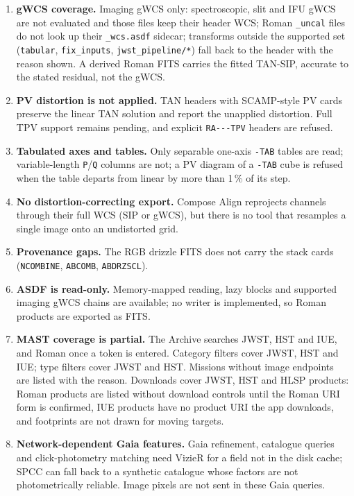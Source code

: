 \documentclass[11pt,a4paper]{article}
\newcommand{\code}[1]{\texttt{\small #1}}
\begin{document}
\begin{enumerate}[nosep]
    \item \textbf{gWCS coverage.} Imaging gWCS only: spectroscopic, slit and IFU gWCS are not evaluated and those files keep their header WCS; Roman \code{\_uncal} files do not look up their \code{\_wcs.asdf} sidecar; transforms outside the supported set (\code{tabular}, \code{fix\_inputs}, \code{jwst\_pipeline/*}) fall back to the header with the reason shown. A derived Roman FITS carries the fitted TAN-SIP, accurate to the stated residual, not the gWCS.
    \item \textbf{PV distortion is not applied.} TAN headers with SCAMP-style PV cards preserve the linear TAN solution and report the unapplied distortion. Full TPV support remains pending, and explicit \code{RA-{}-{}-TPV} headers are refused.
    \item \textbf{Tabulated axes and tables.} Only separable one-axis \code{-TAB} tables are read; variable-length \code{P}/\code{Q} columns are not; a PV diagram of a \code{-TAB} cube is refused when the table departs from linear by more than 1\,\% of its step.
    \item \textbf{No distortion-correcting export.} Compose Align reprojects channels through their full WCS (SIP or gWCS), but there is no tool that resamples a single image onto an undistorted grid.
    \item \textbf{Provenance gaps.} The RGB drizzle FITS does not carry the stack cards (\code{NCOMBINE}, \code{ABCOMB}, \code{ABDRZSCL}).
    \item \textbf{ASDF is read-only.} Memory-mapped reading, lazy blocks and supported imaging gWCS chains are available; no writer is implemented, so Roman products are exported as FITS.
    \item \textbf{MAST coverage is partial.} The Archive searches JWST, HST and IUE, and Roman once a token is entered. Category filters cover JWST, HST and IUE; type filters cover JWST and HST. Missions without image endpoints are listed with the reason. Downloads cover JWST, HST and HLSP products: Roman products are listed without download controls until the Roman URI form is confirmed, IUE products have no product URI the app downloads, and footprints are not drawn for moving targets.
    \item \textbf{Network-dependent Gaia features.} Gaia refinement, catalogue queries and click-photometry matching need VizieR for a field not in the disk cache; SPCC can fall back to a synthetic catalogue whose factors are not photometrically reliable. Image pixels are not sent in these Gaia queries.

\end{enumerate}
\end{document}

